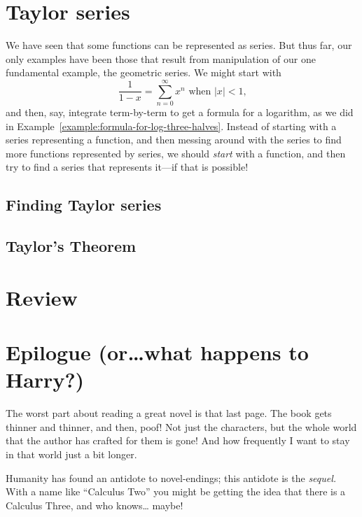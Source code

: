 \documentclass[justified]{tufte-book}
\newcommand{\xrefn}[1]{\ref{#1}}
\begin{document}
\chapter{Taylor series}
\label{chapter:taylor-series}

We have seen that some functions can be represented as
series.  But thus far, our only examples have been those that result
from manipulation of our one fundamental example, the geometric
series.  We might start with
$$
\frac{1}{1-x} = \sum_{n=0}^\infty x^n \mbox{ when $|x| < 1$,}
$$
and then, say, integrate term-by-term to get a formula for a
logarithm, as we did in
Example~\xrefn{example:formula-for-log-three-halves}.  Instead of
starting with a series representing a function, and then messing
around with the series to find more functions represented by series,
we should \textit{start} with a function, and then try to find a
series that represents it---if that is possible!

\section{Finding Taylor series}
\label{section:finding-taylor-series}


\section{Taylor's Theorem}
\label{section:taylors-theorem}


\chapter*{Review}


 \chapter*{Epilogue (or\ldots what happens to Harry?)}

 The worst part about reading a great
 novel is that last page.  The book gets thinner and thinner, and
 then, poof!  Not just the characters, but the whole world that the
 author has crafted for them is gone!  And how frequently I want to
 stay in that world just a bit longer.

 Humanity has found an antidote to novel-endings; this antidote is the
 \textit{sequel.}  With a name like ``Calculus Two'' you might be
 getting the idea that there is a Calculus Three, and who knows\ldots
 maybe!
\end{document}

